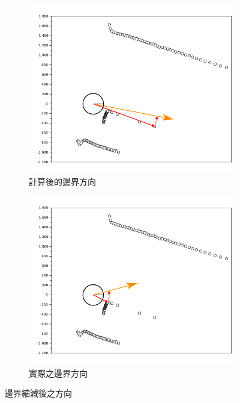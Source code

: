 \begin{figure}[h!]
	\centering
	\begin{subfigure}[t]{0.8\textwidth}
		\includegraphics[width=\textwidth]{figures/algorithm/w_b_wrong_direction}
		\caption{計算後的邊界方向}
		\label{f:w_b_wrong_direction}
	\end{subfigure}
	\begin{subfigure}[t]{0.8\textwidth}
		\includegraphics[width=\textwidth]{figures/algorithm/w_b_right_direction}
		\caption{實際之邊界方向}
		\label{f:w_b_right_direction}
	\end{subfigure}
	\caption{邊界縮減後之方向}
	\label{f:wrong_boundary_directions}
\end{figure}

